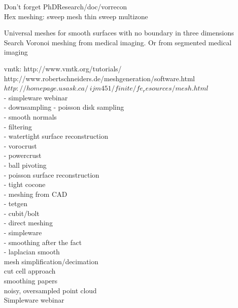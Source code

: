 Don't forget PhDResearch/doc/vorrecon \\

Hex meshing:
sweep mesh
thin sweep
multizone

Universal meshes for smooth surfaces with no boundary in three dimensions \\

Search Voronoi meshing from medical imaging. Or from segmented medical imaging

vmtk: http://www.vmtk.org/tutorials/ \\

http://www.robertschneiders.de/meshgeneration/software.html \\

$http://homepage.usask.ca/~ijm451/finite/fe_resources/mesh.html$ \\

- simpleware webinar \\

- downsampling - poisson disk sampling\\
- smooth normals\\
- filtering\\

- watertight surface reconstruction\\
	- vorocrust\\
	- powercrust\\
	- ball pivoting\\
	- poisson surface reconstruction\\
	- tight cocone\\
	
- meshing from CAD\\
    - tetgen\\
    - cubit/bolt\\
    
- direct meshing\\
	- simpleware\\

- smoothing after the fact\\
	- laplacian smooth\\

mesh simplification/decimation\\
cut cell approach\\
smoothing papers\\

noisy, oversampled point cloud\\


Simpleware webinar

